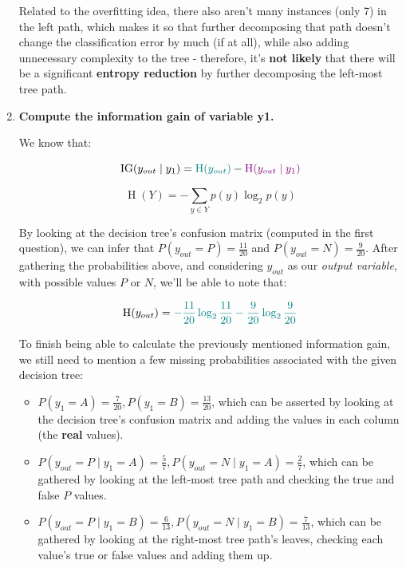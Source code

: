 \documentclass[12pt]{article}
\begin{document}
\begin{enumerate}[leftmargin=\labelsep]
        Related to the overfitting idea, there also aren't many instances (only 7) in the
        left path, which makes it so that further decomposing that path doesn't change
        the classification error by much (if at all), while also adding unnecessary
        complexity to the tree - therefore, it's \textbf{not likely} that there will be a significant
        \textbf{entropy reduction} by further decomposing the left-most tree path.

  \item \textbf{Compute the information gain of variable y1.}

        We know that:

        \begin{equation}
          \operatorname{IG}(y_{out} \mid y_1) = \textcolor{teal}{\operatorname{H}(y_{out})} - \textcolor{violet}{\operatorname{H}(y_{out} \mid y_1)}
        \end{equation}

        \begin{equation}
          \operatorname{H}(Y) = -\sum_{y \in Y} p(y) \log_2 p(y)
        \end{equation}

        By looking at the decision tree's confusion matrix (computed in the first question),
        we can infer that $P(y_{out} = P) = \frac{11}{20}$ and $P(y_{out} = N) = \frac{9}{20}$.
        After gathering the probabilities above, and considering $y_{out}$ as our \textit{output variable}, with possible values $P$ or $N$,
        we'll be able to note that:

        \begin{equation}
          \operatorname{H}(y_{out}) = \textcolor{teal}{- \frac{11}{20} \log_2 \frac{11}{20} - \frac{9}{20} \log_2 \frac{9}{20}}
        \end{equation}

To finish being able to calculate the previously mentioned information gain, we still
need to mention a few missing probabilities associated with the given decision tree:

\begin{itemize}
  \item $P(y_1 = A) = \frac{7}{20}, P(y_1 = B) = \frac{13}{20}$,
  which can be asserted by looking at the decision tree's confusion matrix
  and adding the values in each column (the \textbf{real} values).
  \item $P(y_{out} = P \mid y_1 = A) = \frac{5}{7}, P(y_{out} = N \mid y_1 = A) = \frac{2}{7}$,
  which can be gathered by looking at the left-most tree path and checking the true
  and false $P$ values.
  \item $P(y_{out} = P \mid y_1 = B) = \frac{6}{13}, P(y_{out} = N \mid y_1 = B) = \frac{7}{13}$,
  which can be gathered by looking at the right-most tree path's leaves,
  checking each value's true or false values and adding them up.
\end{itemize}


\end{enumerate}
\end{document}
